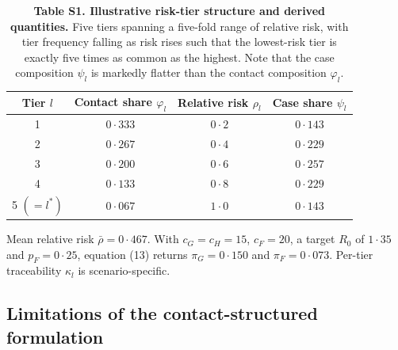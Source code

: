\documentclass[9pt,letterpaper]{extarticle}
\begin{document}
\begin{table}[b]
\centering
\captionsetup{labelformat=empty}
\caption{\textbf{Table S1. Illustrative risk-tier structure and derived quantities.} Five tiers spanning a five-fold range of relative risk, with tier frequency falling as risk rises such that the lowest-risk tier is exactly five times as common as the highest. Note that the case composition $\psi_l$ is markedly flatter than the contact composition $\varphi_l$.}
\footnotesize
\begin{tabular}{cccc}
\toprule
Tier $l$ & Contact share $\varphi_l$ & Relative risk $\rho_l$ & Case share $\psi_l$ \\
\midrule
1 & $0{\cdot}333$ & $0{\cdot}2$ & $0{\cdot}143$ \\
2 & $0{\cdot}267$ & $0{\cdot}4$ & $0{\cdot}229$ \\
3 & $0{\cdot}200$ & $0{\cdot}6$ & $0{\cdot}257$ \\
4 & $0{\cdot}133$ & $0{\cdot}8$ & $0{\cdot}229$ \\
5 $(= l^{*})$ & $0{\cdot}067$ & $1{\cdot}0$ & $0{\cdot}143$ \\
\bottomrule
\end{tabular}

\vspace{2pt}
{\footnotesize Mean relative risk $\bar{\rho} = 0{\cdot}467$. With $c_G = c_H = 15$, $c_F = 20$, a target $R_0$ of $1{\cdot}35$ and $p_F = 0{\cdot}25$, equation (13) returns $\pi_G = 0{\cdot}150$ and $\pi_F = 0{\cdot}073$. Per-tier traceability $\kappa_l$ is scenario-specific.}
\end{table}

\subsection{Limitations of the contact-structured formulation}
\end{document}
